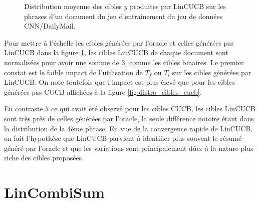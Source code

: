 \begin{figure}[ht!]
  \centering
  \caption[Distribution moyenne des cibles LinCUCB sur les phrases d'un document]
  {Distribution moyenne des cibles $y$ produites par LinCUCB sur les phrases 
  d'un document du jeu d'entraînement du jeu de données CNN/DailyMail.}
  \label{fig:distro_cibles_clinucb}
\end{figure}

Pour mettre à l'échelle les cibles générées par l'oracle 
et celles générées par LinCUCB dans la figure \ref{fig:distro_cibles_clinucb},
les cibles LinCUCB de chaque document sont normalisées pour 
avoir une somme de 3, comme les cibles binaires.
Le premier constat est le faible impact de l'utilisation de $T_f$ 
ou $T_l$ sur les cibles générées par LinCUCB.
On note toutefois que l'impact est plus élevé que pour les cibles 
générées pas CUCB affichées à la figure \ref{fig:distro_cibles_cucb}.

En contraste à ce qui avait été observé pour les cibles CUCB,
les cibles LinCUCB sont très près de celles générées par l'oracle,
la seule différence notoire étant dans la distribution de la 4ème 
phrase.
En vue de la convergence rapide de LinCUCB, on fait l'hypothèse 
que LinCUCB parvient à identifier plus souvent 
le résumé généré par l'oracle et que les variations sont 
principalement dûes à la nature plus riche des cibles proposées.

\section{LinCombiSum}
\label{section:lincombisum}

